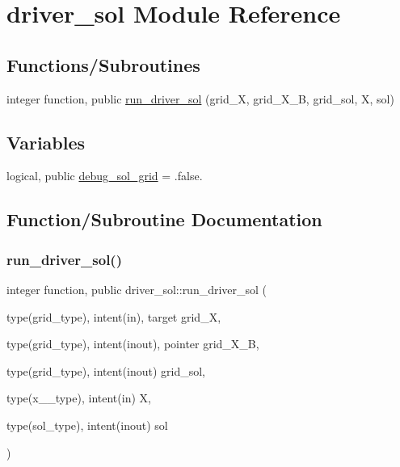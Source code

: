 \hypertarget{namespacedriver__sol}{}\section{driver\+\_\+sol Module Reference}
\label{namespacedriver__sol}
\subsection*{Functions/\+Subroutines}
\begin{DoxyCompactItemize}
\item 
integer function, public \hyperlink{namespacedriver__sol_a208ddea649ee160b7a55da8d0a5d4847}{run\+\_\+driver\+\_\+sol} (grid\+\_\+X, grid\+\_\+\+X\+\_\+B, grid\+\_\+sol, X, sol)
\end{DoxyCompactItemize}
\subsection*{Variables}
\begin{DoxyCompactItemize}
\item 
logical, public \hyperlink{namespacedriver__sol_a00a6ea22e1eda4ae9ec46da624d0cfb0}{debug\+\_\+sol\+\_\+grid} = .false.
\end{DoxyCompactItemize}


\subsection{Function/\+Subroutine Documentation}
\mbox{\label{namespacedriver__sol_a208ddea649ee160b7a55da8d0a5d4847}} 
\subsubsection{\texorpdfstring{run\+\_\+driver\+\_\+sol()}{run\_driver\_sol()}}
{\footnotesize\ttfamily integer function, public driver\+\_\+sol\+::run\+\_\+driver\+\_\+sol (\begin{DoxyParamCaption}\item[{type(grid\+\_\+type), intent(in), target}]{grid\+\_\+X,  }\item[{type(grid\+\_\+type), intent(inout), pointer}]{grid\+\_\+\+X\+\_\+B,  }\item[{type(grid\+\_\+type), intent(inout)}]{grid\+\_\+sol,  }\item[{type(x\+\_\+2\+\_\+type), intent(in)}]{X,  }\item[{type(sol\+\_\+type), intent(inout)}]{sol }\end{DoxyParamCaption})}



